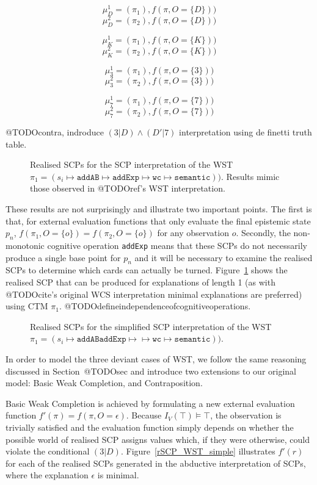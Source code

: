 \[
\mu_D^1=(\pi_1), f(\pi, O=\{D\}))
\]
\[
\mu_D^2=(\pi_2), f(\pi, O=\{D\}))
\]

\[
\mu_K^1=(\pi_1), f(\pi, O=\{K\}))
\]
\[
\mu_K^2=(\pi_2), f(\pi, O=\{K\}))
\]

\[
\mu_3^1=(\pi_1), f(\pi, O=\{3\}))
\]
\[
\mu_3^2=(\pi_2), f(\pi, O=\{3\}))
\]

\[
\mu_7^1=(\pi_1), f(\pi, O=\{7\}))
\]
\[
\mu_7^2=(\pi_2), f(\pi, O=\{7\}))
\]

@TODOcontra, indroduce $(3|D) \land (D' | 7 )$ interpretation using de finetti truth table.

\begin{figure}
\label{fig:rSCP_WST}
\caption{Realised SCPs for the SCP interpretation of the WST $\pi_1=(s_i \longmapsto \texttt{addAB} \longmapsto \texttt{addExp}  \longmapsto \texttt{wc} \longmapsto \texttt{semantic}))$. Results mimic those observed in @TODOref's WST interpretation.}
\end{figure}

These results are not surprisingly and illustrate two important points. The first is that, for external evaluation functions that only evaluate the final epistemic state $p_n$, $f(\pi_1,O=\{o\})=f(\pi_2,O=\{o\})$ for any observation $o$. Secondly, the non-monotonic cognitive operation \texttt{addExp} means that these SCPs do not necessarily produce a single base point for $p_n$ and it will be necessary to examine the realised SCPs to determine which cards can actually be turned. Figure~\ref{fig:rSCP_WST} shows the realised SCP that can be produced for explanations of length 1 (as with @TODOcite's original WCS interpretation minimal explanations are preferred) using CTM $\pi_1$. @TODOdefineindependenceofcognitiveoperations. 

\begin{figure}
\label{fig:rSCP_WST_simple}
\caption{Realised SCPs for the simplified SCP interpretation of the WST $\pi_1=(s_i \longmapsto \texttt{addAB} \texttt{addExp} \longmapsto \longmapsto \texttt{wc} \longmapsto \texttt{semantic}))$.}
\end{figure}

In order to model the three deviant cases of WST, we follow the same reasoning discussed in Section~@TODOsec and introduce two extensions to our original model: Basic Weak Completion, and Contraposition.

Basic Weak Completion is achieved by formulating a new external evaluation function $f'(\pi)=f(\pi,O=\epsilon)$. Because $I_V(\top)\models \top$, the observation is trivially satisfied and the evaluation function simply depends on whether the possible world of realised SCP assigns values which, if they were otherwise, could violate the conditional $(3|D)$. Figure~\ref{rSCP_WST_simple} illustrates $f'(r)$ for each of the realised SCPs generated in the abductive interpretation of SCPs, where the explanation $\epsilon$  is minimal.

